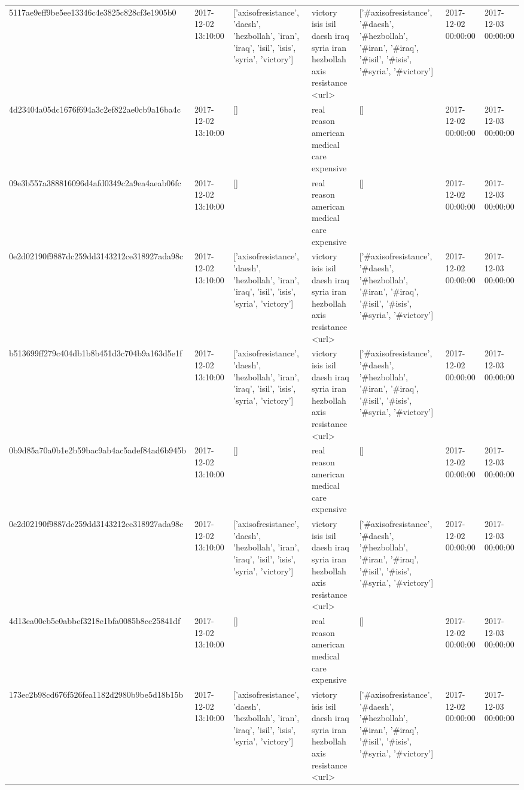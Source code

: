 \begin{tabular}{lllllll}
5117ae9eff9be5ee13346c4e3825c828cf3e1905b0 & 2017-12-02 13:10:00 & ['axisofresistance', 'daesh', 'hezbollah', 'iran', 'iraq', 'isil', 'isis', 'syria', 'victory'] & victory isis isil daesh iraq syria iran hezbollah axis resistance <url> & ['#axisofresistance', '#daesh', '#hezbollah', '#iran', '#iraq', '#isil', '#isis', '#syria', '#victory'] & 2017-12-02 00:00:00 & 2017-12-03 00:00:00 \\
4d23404a05dc1676f694a3c2ef822ae0cb9a16ba4c & 2017-12-02 13:10:00 & [] & real reason american medical care expensive & [] & 2017-12-02 00:00:00 & 2017-12-03 00:00:00 \\
09e3b557a388816096d4afd0349c2a9ea4aeab06fc & 2017-12-02 13:10:00 & [] & real reason american medical care expensive & [] & 2017-12-02 00:00:00 & 2017-12-03 00:00:00 \\
0e2d02190f9887dc259dd3143212ce318927ada98c & 2017-12-02 13:10:00 & ['axisofresistance', 'daesh', 'hezbollah', 'iran', 'iraq', 'isil', 'isis', 'syria', 'victory'] & victory isis isil daesh iraq syria iran hezbollah axis resistance <url> & ['#axisofresistance', '#daesh', '#hezbollah', '#iran', '#iraq', '#isil', '#isis', '#syria', '#victory'] & 2017-12-02 00:00:00 & 2017-12-03 00:00:00 \\
b513699ff279c404db1b8b451d3c704b9a163d5e1f & 2017-12-02 13:10:00 & ['axisofresistance', 'daesh', 'hezbollah', 'iran', 'iraq', 'isil', 'isis', 'syria', 'victory'] & victory isis isil daesh iraq syria iran hezbollah axis resistance <url> & ['#axisofresistance', '#daesh', '#hezbollah', '#iran', '#iraq', '#isil', '#isis', '#syria', '#victory'] & 2017-12-02 00:00:00 & 2017-12-03 00:00:00 \\
0b9d85a70a0b1e2b59bac9ab4ac5adef84ad6b945b & 2017-12-02 13:10:00 & [] & real reason american medical care expensive & [] & 2017-12-02 00:00:00 & 2017-12-03 00:00:00 \\
0e2d02190f9887dc259dd3143212ce318927ada98c & 2017-12-02 13:10:00 & ['axisofresistance', 'daesh', 'hezbollah', 'iran', 'iraq', 'isil', 'isis', 'syria', 'victory'] & victory isis isil daesh iraq syria iran hezbollah axis resistance <url> & ['#axisofresistance', '#daesh', '#hezbollah', '#iran', '#iraq', '#isil', '#isis', '#syria', '#victory'] & 2017-12-02 00:00:00 & 2017-12-03 00:00:00 \\
4d13ea00cb5e0abbef3218e1bfa0085b8cc25841df & 2017-12-02 13:10:00 & [] & real reason american medical care expensive & [] & 2017-12-02 00:00:00 & 2017-12-03 00:00:00 \\
173ec2b98cd676f526fea1182d2980b9be5d18b15b & 2017-12-02 13:10:00 & ['axisofresistance', 'daesh', 'hezbollah', 'iran', 'iraq', 'isil', 'isis', 'syria', 'victory'] & victory isis isil daesh iraq syria iran hezbollah axis resistance <url> & ['#axisofresistance', '#daesh', '#hezbollah', '#iran', '#iraq', '#isil', '#isis', '#syria', '#victory'] & 2017-12-02 00:00:00 & 2017-12-03 00:00:00 \\

\end{tabular}
